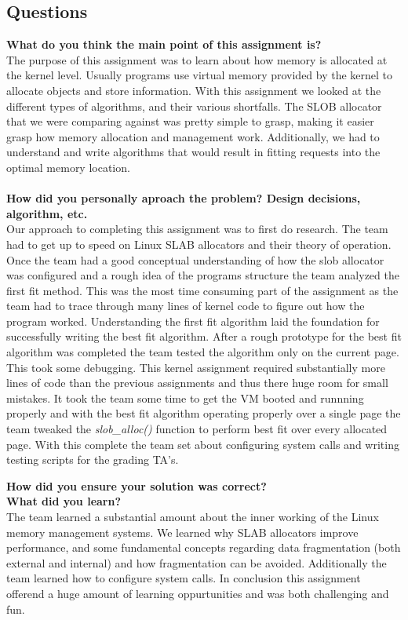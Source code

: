 \documentclass[10pt,onecolumn,draftclsnofoot]{IEEEtran} %
\begin{document}
\begin{singlespace}
\section{\bf Questions}
        \textbf{What do you think the main point of this assignment is?}\\
                \normalfont \indent The purpose of this assignment was to learn about how memory is allocated at the kernel level. Usually programs use virtual memory provided by the kernel to allocate objects and store information.  With this assignment we looked at the different types of algorithms, and their various shortfalls.  The SLOB allocator that we were comparing against was pretty simple to grasp, making it easier grasp how memory allocation and management work. Additionally, we had to understand and write algorithms that would result in fitting requests into the optimal memory location. \\\\
       \textbf{How did you personally aproach the problem? Design decisions, algorithm, etc.}\\
	  		\normalfont \indent Our approach to completing this assignment was to first do research. The team had to get up to speed on Linux SLAB allocators and their theory of operation. Once the team had a good conceptual understanding of how the slob allocator was configured and a rough idea of the programs structure the team analyzed the first fit method. This was the most time consuming part of the assignment as the team had to trace through many lines of kernel code to figure out how the program worked. Understanding the first fit algorithm laid the foundation for successfully writing the best fit algorithm. After a rough prototype for the best fit algorithm was completed the team tested the algorithm only on the current page. This took some debugging. This kernel assignment required substantially more lines of code than the previous assignments and thus there huge room for small mistakes. It took the team some time to get the VM booted and runnning properly and with the best fit algorithm operating properly over a single page the team tweaked the \textit{slob\_alloc()} function to perform best fit over every allocated page. With this complete the team set about configuring system calls and writing testing scripts for the grading TA's.
 
	\textbf{How did you ensure your solution was correct?}\\
                \normalfont \indent   
        \textbf{What did you learn?}\\
        		\normalfont \indent The team learned a substantial amount about the inner working of the Linux memory management systems. We learned why SLAB allocators improve performance, and some fundamental concepts regarding data fragmentation (both external and internal) and how fragmentation can be avoided. Additionally the team learned how to configure system calls. In conclusion this assignment offerend a huge amount of learning oppurtunities and was both challenging and fun. 


\end{singlespace}
\end{document}
